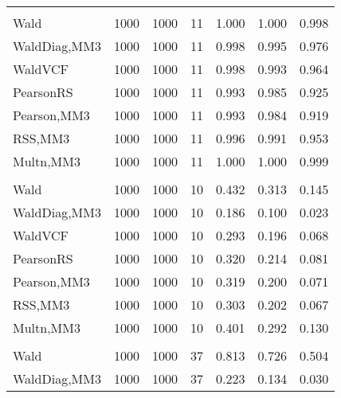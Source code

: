 \documentclass[
]{article}
\begin{document}
\begin{table}[H]
{\begin{tabular}[t]{lrrrrrr}
\addlinespace[0.3em]
\multicolumn{7}{l}{\textbf{1F 15V}}\\
\hspace{1em}Wald & 1000 & 1000 & 11 & 1.000 & 1.000 & 0.998\\
\hspace{1em}WaldDiag,MM3 & 1000 & 1000 & 11 & 0.998 & 0.995 & 0.976\\
\hspace{1em}WaldVCF & 1000 & 1000 & 11 & 0.998 & 0.993 & 0.964\\
\hspace{1em}PearsonRS & 1000 & 1000 & 11 & 0.993 & 0.985 & 0.925\\
\hspace{1em}Pearson,MM3 & 1000 & 1000 & 11 & 0.993 & 0.984 & 0.919\\
\hspace{1em}RSS,MM3 & 1000 & 1000 & 11 & 0.996 & 0.991 & 0.953\\
\hspace{1em}Multn,MM3 & 1000 & 1000 & 11 & 1.000 & 1.000 & 0.999\\
\addlinespace[0.3em]
\multicolumn{7}{l}{\textbf{2F 10V}}\\
\hspace{1em}Wald & 1000 & 1000 & 10 & 0.432 & 0.313 & 0.145\\
\hspace{1em}WaldDiag,MM3 & 1000 & 1000 & 10 & 0.186 & 0.100 & 0.023\\
\hspace{1em}WaldVCF & 1000 & 1000 & 10 & 0.293 & 0.196 & 0.068\\
\hspace{1em}PearsonRS & 1000 & 1000 & 10 & 0.320 & 0.214 & 0.081\\
\hspace{1em}Pearson,MM3 & 1000 & 1000 & 10 & 0.319 & 0.200 & 0.071\\
\hspace{1em}RSS,MM3 & 1000 & 1000 & 10 & 0.303 & 0.202 & 0.067\\
\hspace{1em}Multn,MM3 & 1000 & 1000 & 10 & 0.401 & 0.292 & 0.130\\
\addlinespace[0.3em]
\multicolumn{7}{l}{\textbf{3F 15V}}\\
\hspace{1em}Wald & 1000 & 1000 & 37 & 0.813 & 0.726 & 0.504\\
\hspace{1em}WaldDiag,MM3 & 1000 & 1000 & 37 & 0.223 & 0.134 & 0.030\\

\end{tabular}}
\end{table}
\end{document}
